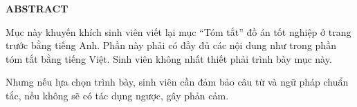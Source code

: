 \documentclass[../DoAn.tex]{subfiles}
\begin{document}
\begin{center}
    \Large{\textbf{ABSTRACT}}\\
\end{center}
\vspace{1cm}
Mục này khuyến khích sinh viên viết lại mục “Tóm tắt” đồ án tốt nghiệp ở trang trước bằng tiếng Anh. Phần này phải có đầy đủ các nội dung như trong phần tóm tắt bằng tiếng Việt.
Sinh viên không nhất thiết phải trình bày mục này.

Nhưng nếu lựa chọn trình bày, sinh viên cần đảm bảo câu từ và ngữ pháp chuẩn tắc, nếu không sẽ có tác dụng ngược, gây phản cảm.
\end{document}
